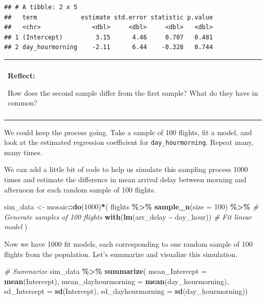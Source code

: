 \documentclass[
]{book}
\newenvironment{Shaded}{\begin{snugshade}}{\end{snugshade}}
\newcommand{\AttributeTok}[1]{\textcolor[rgb]{0.13,0.29,0.53}{#1}}
\newcommand{\CommentTok}[1]{\textcolor[rgb]{0.56,0.35,0.01}{\textit{#1}}}
\newcommand{\DecValTok}[1]{\textcolor[rgb]{0.00,0.00,0.81}{#1}}
\newcommand{\FunctionTok}[1]{\textcolor[rgb]{0.13,0.29,0.53}{\textbf{#1}}}
\newcommand{\NormalTok}[1]{#1}
\newcommand{\OtherTok}[1]{\textcolor[rgb]{0.56,0.35,0.01}{#1}}
\newcommand{\SpecialCharTok}[1]{\textcolor[rgb]{0.81,0.36,0.00}{\textbf{#1}}}
\newenvironment{reflect}
{
    \begin{center}
    
    \begin{tabular}{|p{0.8\textwidth}|}
    \rowcolor{LightBlue}
    \hline\\
    \rowcolor{LightBlue}
    \textbf{Reflect:}
}
{
    \\\rowcolor{LightBlue}
    \\\hline
    \end{tabular} 
    \end{center}
}
\begin{document}
\begin{verbatim}
## # A tibble: 2 x 5
##   term            estimate std.error statistic p.value
##   <chr>              <dbl>     <dbl>     <dbl>   <dbl>
## 1 (Intercept)         3.15      4.46     0.707   0.481
## 2 day_hourmorning    -2.11      6.44    -0.328   0.744
\end{verbatim}

\begin{reflect}
How does the second sample differ from the first sample? What do they
have in common?
\end{reflect}

We could keep the process going. Take a sample of 100 flights, fit a model, and look at the estimated regression coefficient for \texttt{day\_hourmorning}. Repeat many, many times.

We can add a little bit of code to help us simulate this sampling process 1000 times and estimate the difference in mean arrival delay between morning and afternoon for each random sample of 100 flights.

\begin{Shaded}
\begin{Highlighting}[]
\NormalTok{sim\_data }\OtherTok{\textless{}{-}}\NormalTok{ mosaic}\SpecialCharTok{::}\FunctionTok{do}\NormalTok{(}\DecValTok{1000}\NormalTok{)}\SpecialCharTok{*}\NormalTok{( }
\NormalTok{    flights }\SpecialCharTok{\%\textgreater{}\%} 
      \FunctionTok{sample\_n}\NormalTok{(}\AttributeTok{size =} \DecValTok{100}\NormalTok{) }\SpecialCharTok{\%\textgreater{}\%}  \CommentTok{\# Generate samples of 100 flights}
      \FunctionTok{with}\NormalTok{(}\FunctionTok{lm}\NormalTok{(arr\_delay }\SpecialCharTok{\textasciitilde{}}\NormalTok{ day\_hour)) }\CommentTok{\# Fit linear model}
\NormalTok{)}
\end{Highlighting}
\end{Shaded}

Now we have 1000 fit models, each corresponding to one random sample of 100 flights from the population. Let's summarize and visualize this simulation.

\begin{Shaded}
\begin{Highlighting}[]
\CommentTok{\# Summarize}
\NormalTok{sim\_data }\SpecialCharTok{\%\textgreater{}\%} 
    \FunctionTok{summarize}\NormalTok{(}
        \AttributeTok{mean\_Intercept =} \FunctionTok{mean}\NormalTok{(Intercept),}
        \AttributeTok{mean\_dayhourmorning =} \FunctionTok{mean}\NormalTok{(day\_hourmorning),}
        \AttributeTok{sd\_Intercept =} \FunctionTok{sd}\NormalTok{(Intercept),}
        \AttributeTok{sd\_dayhourmorning =} \FunctionTok{sd}\NormalTok{(day\_hourmorning))}
\end{Highlighting}
\end{Shaded}
\end{document}
